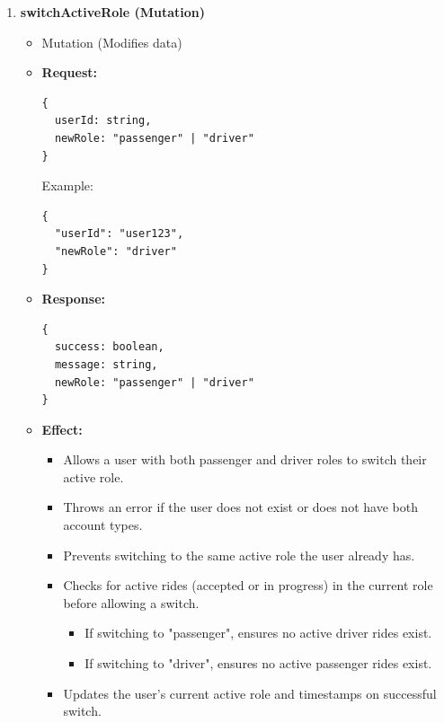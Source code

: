 \documentclass[a4paper,12pt]{article}
\begin{document}
\begin{enumerate}
\item \textbf{switchActiveRole (Mutation)}
    \begin{itemize}
      \item Mutation (Modifies data)
      \item \textbf{Request:}
      \begin{verbatim}
{
  userId: string,
  newRole: "passenger" | "driver"
}
      \end{verbatim}
      Example:
      \begin{verbatim}
{
  "userId": "user123",
  "newRole": "driver"
}
      \end{verbatim}
      \item \textbf{Response:}
      \begin{verbatim}
{
  success: boolean,
  message: string,
  newRole: "passenger" | "driver"
}
      \end{verbatim}
      \item \textbf{Effect:}
      \begin{itemize}
        \item Allows a user with both passenger and driver roles to switch their active role.
        \item Throws an error if the user does not exist or does not have both account types.
        \item Prevents switching to the same active role the user already has.
        \item Checks for active rides (accepted or in progress) in the current role before allowing a switch.
          \begin{itemize}
            \item If switching to "passenger", ensures no active driver rides exist.
            \item If switching to "driver", ensures no active passenger rides exist.
          \end{itemize}
        \item Updates the user's current active role and timestamps on successful switch.
      \end{itemize}
    \end{itemize}


\end{enumerate}
\end{document}
